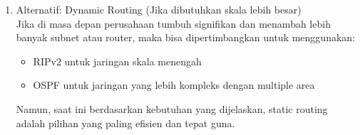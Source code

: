 \begin{enumerate}
\begin{enumerate}
    \item Alternatif: Dynamic Routing (Jika dibutuhkan skala lebih besar)
    \\Jika di masa depan perusahaan tumbuh signifikan dan menambah lebih banyak subnet atau router, maka bisa dipertimbangkan untuk menggunakan:
    \begin{itemize}
        \item RIPv2 untuk jaringan skala menengah
        \item OSPF untuk jaringan yang lebih kompleks dengan multiple area
    \end{itemize}
    Namun, saat ini berdasarkan kebutuhan yang dijelaskan, static routing adalah pilihan yang paling efisien dan tepat guna.
    \end{enumerate}
\end{enumerate}